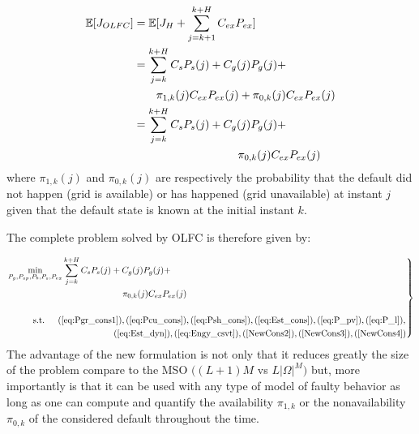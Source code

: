\documentclass[conference]{IEEEtran}
\begin{document}
\begin{equation}
    \begin{split}
        \mathbb{E}[J_{OLFC}] &=\mathbb{E}[J_H + \sum_{j=k+1}^{k+H}C_{ex}P_{ex}] \hspace{70px} \\
                             &=\sum_{j=k}^{k+H}  C_sP_s(j) + C_g(j)P_g(j) + \\ &\hspace{20px}\pi_{1,k}(j)C_{ex}P_{ex}(j) + \pi_{0,k}(j)C_{ex}P_{ex}(j)\\
                             &=\sum_{j=k}^{k+H}  C_sP_s(j) + C_g(j)P_g(j) + \\ &\hspace{92px} \pi_{0,k}(j)C_{ex}P_{ex}(j)\\
    \end{split}
\end{equation}where $\pi_{1,k}(j)$  and $\pi_{0,k}(j)$ are respectively the probability that the default did not happen (grid is available) or has happened (grid unavailable) at instant $j$ given that the default  state is known at the initial instant $k$.

The complete problem solved by OLFC is therefore given by: 

\begin{equation}\label{eq:OLFCsys}
\left. 
\begin{aligned}
&\underset{P_g,P_{sp},P_b,P_s,P_{ex}}{\text{min}} \hspace{0px} \sum_{j=k}^{k+H}  C_sP_s(j) + C_g(j)P_g(j) +\\ & \hspace{130px} \pi_{0,k}(j)C_{ex}P_{ex}(j)\\  \\
& \text{\hspace{25px} s.t.\hspace{15px}}(\ref{eq:Pgr_cons1}),(\ref{eq:Pcu_cons}),(\ref{eq:Psh_cons}),(\ref{eq:Est_cons}),(\ref{eq:P_pv}),(\ref{eq:P_l}),\\
& \hspace{120px}(\ref{eq:Est_dyn}),(\ref{eq:Engy_csvt}),(\ref{NewCons2}),(\ref{NewCons3}),(\ref{NewCons4})
\end{aligned}\right \}
\end{equation}
The advantage of the new formulation is not only that it reduces greatly the size of the problem compare to the MSO $((L+1)M$ vs $L|\Omega|^M)$ but, more importantly is that it can be used with any type of model of faulty behavior as long as one can compute and quantify the availability $\pi_{1,k}$ or the nonavailability $\pi_{0,k}$ of the considered default throughout the time. 
\end{document}
